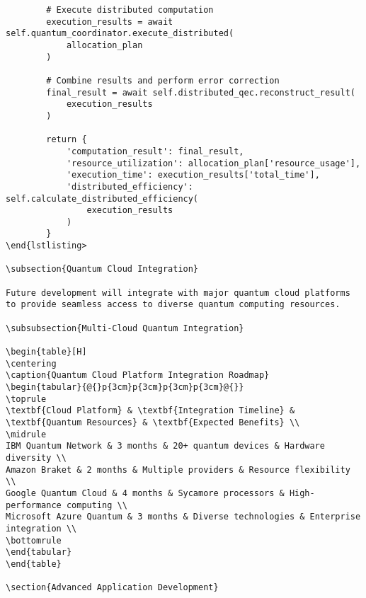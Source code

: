 \documentclass[12pt,a4paper]{report}
\begin{document}
\begin{lstlisting}
        # Execute distributed computation
        execution_results = await self.quantum_coordinator.execute_distributed(
            allocation_plan
        )

        # Combine results and perform error correction
        final_result = await self.distributed_qec.reconstruct_result(
            execution_results
        )

        return {
            'computation_result': final_result,
            'resource_utilization': allocation_plan['resource_usage'],
            'execution_time': execution_results['total_time'],
            'distributed_efficiency': self.calculate_distributed_efficiency(
                execution_results
            )
        }
\end{lstlisting>

\subsection{Quantum Cloud Integration}

Future development will integrate with major quantum cloud platforms to provide seamless access to diverse quantum computing resources.

\subsubsection{Multi-Cloud Quantum Integration}

\begin{table}[H]
\centering
\caption{Quantum Cloud Platform Integration Roadmap}
\begin{tabular}{@{}p{3cm}p{3cm}p{3cm}p{3cm}@{}}
\toprule
\textbf{Cloud Platform} & \textbf{Integration Timeline} & \textbf{Quantum Resources} & \textbf{Expected Benefits} \\
\midrule
IBM Quantum Network & 3 months & 20+ quantum devices & Hardware diversity \\
Amazon Braket & 2 months & Multiple providers & Resource flexibility \\
Google Quantum Cloud & 4 months & Sycamore processors & High-performance computing \\
Microsoft Azure Quantum & 3 months & Diverse technologies & Enterprise integration \\
\bottomrule
\end{tabular}
\end{table}

\section{Advanced Application Development}


\end{lstlisting}
\end{document}
